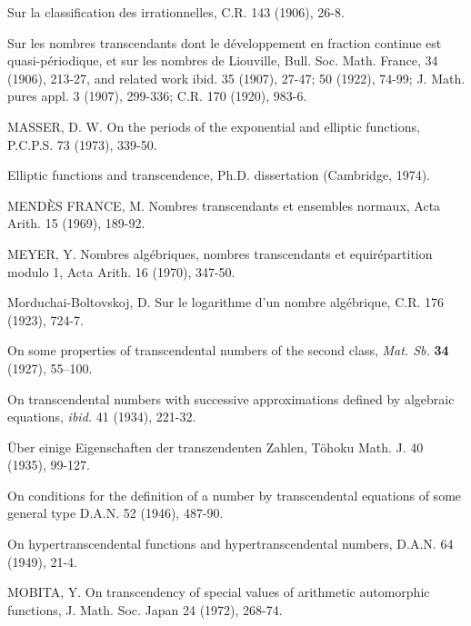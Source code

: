 \begin{hanglist}
    \item \hspace{1.5em} Sur la classification des irrationnelles, C.R. 143 (1906), 26-8.
    \item \hspace{1.5em} Sur les nombres transcendants dont le développement en fraction continue est quasi-périodique, et sur les nombres de Liouville, Bull. Soc. Math. France, 34 (1906), 213-27, and related work ibid. 35 (1907), 27-47; 50 (1922), 74-99; J. Math. pures appl. 3 (1907), 299-336; C.R. 170 (1920), 983-6.
    \item MASSER, D. W. On the periods of the exponential and elliptic functions, P.C.P.S. 73 (1973), 339-50.
    \item \hspace{1.5em} Elliptic functions and transcendence, Ph.D. dissertation (Cambridge, 1974).
    \item MENDÈS FRANCE, M. Nombres transcendants et ensembles normaux, Acta Arith. 15 (1969), 189-92.
    \item MEYER, Y. Nombres algébriques, nombres transcendants et equirépartition modulo 1, Acta Arith. 16 (1970), 347-50.
    \item Morduchai-Boltovskoj, D. Sur le logarithme d'un nombre algébrique, C.R. 176 (1923), 724-7.
    \item \hspace{1.5em} On some properties of transcendental numbers of the second class, \textit{Mat. Sb.} \textbf{34} (1927), 55–100.
    \item \hspace{1.5em} On transcendental numbers with successive approximations defined by algebraic equations, \textit{ibid.} 41 (1934), 221-32.
    \item \hspace{1.5em} Über einige Eigenschaften der transzendenten Zahlen, Töhoku Math. J. 40 (1935), 99-127.
    \item \hspace{1.5em} On conditions for the definition of a number by transcendental equations of some general type D.A.N. 52 (1946), 487-90.
    \item \hspace{1.5em} On hypertranscendental functions and hypertranscendental numbers, D.A.N. 64 (1949), 21-4.
    \item MOBITA, Y. On transcendency of special values of arithmetic automorphic functions, J. Math. Soc. Japan 24 (1972), 268-74.

\end{hanglist}
